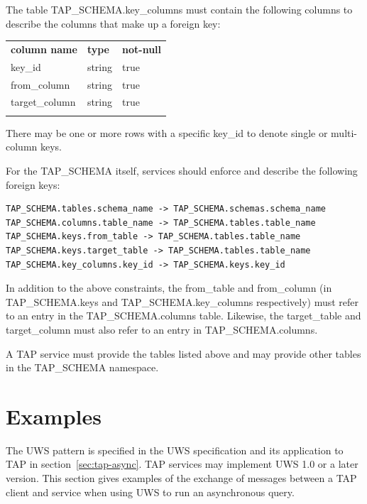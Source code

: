 \documentclass[11pt,letter]{ivoa}
\newcommand{\tapschema}{TAP\_SCHE\-MA}
\newcommand{\tapschema}{\mbox{%
  \relsize{-0.5}TAP\discretionary{-}{}{\kern-2pt\_}SCHEMA}}
\begin{document}
The table \tapschema.key\_columns must contain the 
following columns to describe the columns that make up a foreign key:

\begin{inlinetable}
\begin{tabular}{l l l}
\sptablerule
\textbf{column name} & \textbf{type} & \textbf{not-null} \\
\sptablerule
key\_id & string & true \\
from\_column & string & true \\
target\_column & string & true \\
\sptablerule
\end{tabular}
\end{inlinetable}

There may be one or more rows with a specific key\_id to denote single or multi-column keys.

For the \tapschema{} itself, services should enforce and describe the following foreign keys:

\begin{verbatim}
TAP_SCHEMA.tables.schema_name -> TAP_SCHEMA.schemas.schema_name
TAP_SCHEMA.columns.table_name -> TAP_SCHEMA.tables.table_name
TAP_SCHEMA.keys.from_table -> TAP_SCHEMA.tables.table_name
TAP_SCHEMA.keys.target_table -> TAP_SCHEMA.tables.table_name
TAP_SCHEMA.key_columns.key_id -> TAP_SCHEMA.keys.key_id
\end{verbatim}

In addition to the above constraints, the from\_table and from\_column (in \tapschema.keys and 
\tapschema.key\_columns respectively) must refer to an entry in the \tapschema.columns table. Likewise, 
the target\_table and target\_column must also refer to an entry in \tapschema.columns.

A TAP service must provide the tables listed above and may provide other tables 
in the \tapschema{} namespace.


\section{Examples}
\label{sec:examples}

The UWS pattern is specified in the UWS specification \citep{2016ivoa.spec.1024H} and its application to TAP in 
section~\ref{sec:tap-async}. TAP services may implement UWS 1.0
or a later version. 
This section gives examples of the exchange of messages between a 
TAP client and service when using UWS to run an asynchronous query.
\end{document}

